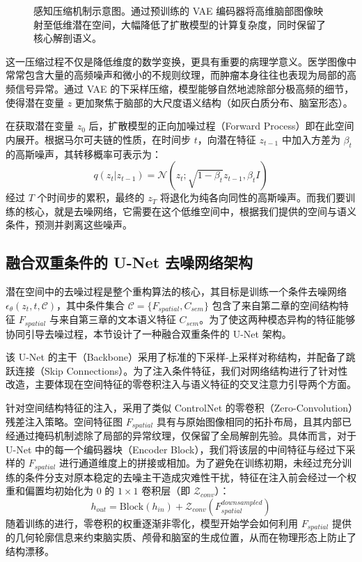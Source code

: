 \documentclass[Win]{xjtuBSThesis}  %
\begin{document}
\begin{figure}[htbp]
    \centering
    \caption{感知压缩机制示意图。通过预训练的 VAE 编码器将高维脑部图像映射至低维潜在空间，大幅降低了扩散模型的计算复杂度，同时保留了核心解剖语义。}
    \label{fig:vae_compression}
\end{figure}

这一压缩过程不仅是降低维度的数学变换，更具有重要的病理学意义。医学图像中常常包含大量的高频噪声和微小的不规则纹理，而肿瘤本身往往也表现为局部的高频信号异常。通过 VAE 的下采样压缩，模型能够自然地滤除部分极高频的细节，使得潜在变量 $z$ 更加聚焦于脑部的大尺度语义结构（如灰白质分布、脑室形态）。

在获取潜在变量 $z_0$ 后，扩散模型的正向加噪过程（Forward Process）即在此空间内展开。根据马尔可夫链的性质，在时间步 $t$，向潜在特征 $z_{t-1}$ 中加入方差为 $\beta_t$ 的高斯噪声，其转移概率可表示为：
$$q(z_t | z_{t-1}) = \mathcal{N}(z_t; \sqrt{1 - \beta_t} z_{t-1}, \beta_t I)$$
经过 $T$ 个时间步的累积，最终的 $z_T$ 将退化为纯各向同性的高斯噪声。而我们要训练的核心，就是去噪网络，它需要在这个低维空间中，根据我们提供的空间与语义条件，预测并剥离这些噪声。

\subsection{融合双重条件的 U-Net 去噪网络架构}
\label{subsec:dual_condition_unet}

潜在空间中的去噪过程是整个重构算法的核心，其目标是训练一个条件去噪网络 $\epsilon_\theta(z_t, t, \mathcal{C})$，其中条件集合 $\mathcal{C} = \{F_{spatial}, C_{sem}\}$ 包含了来自第二章的空间结构特征 $F_{spatial}$ 与来自第三章的文本语义特征 $C_{sem}$。为了使这两种模态异构的特征能够协同引导去噪过程，本节设计了一种融合双重条件的 U-Net 架构。

该 U-Net 的主干（Backbone）采用了标准的下采样-上采样对称结构，并配备了跳跃连接（Skip Connections）。为了注入条件特征，我们对网络结构进行了针对性改造，主要体现在空间特征的零卷积注入与语义特征的交叉注意力引导两个方面。

针对空间结构特征的注入，采用了类似 ControlNet 的零卷积（Zero-Convolution）残差注入策略。空间特征图 $F_{spatial}$ 具有与原始图像相同的拓扑布局，且其内部已经通过掩码机制滤除了局部的异常纹理，仅保留了全局解剖先验。具体而言，对于 U-Net 中的每一个编码器块（Encoder Block），我们将该层的中间特征与经过下采样的 $F_{spatial}$ 进行通道维度上的拼接或相加。为了避免在训练初期，未经过充分训练的条件分支对原本稳定的去噪主干造成灾难性干扰，特征在注入前会经过一个权重和偏置均初始化为 0 的 $1 \times 1$ 卷积层（即 $\mathcal{Z}_{conv}$）：
$$h_{out} = \text{Block}(h_{in}) + \mathcal{Z}_{conv}(F_{spatial}^{downsampled})$$
随着训练的进行，零卷积的权重逐渐非零化，模型开始学会如何利用 $F_{spatial}$ 提供的几何轮廓信息来约束脑实质、颅骨和脑室的生成位置，从而在物理形态上防止了结构漂移。
\end{document}
